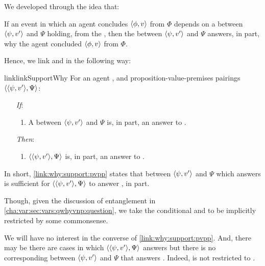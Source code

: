 \begin{note}
  We developed \qWhyVnP{} through the idea that:

  If an event in which an agent concludes \(\langle \phi, v \rangle\) from \(\Phi\) depends on a  between \(\langle \psi, v' \rangle\) and \(\Psi\) holding, from the \agpe{}, then the  between \(\langle \psi, v' \rangle\) and \(\Psi\) answers, in part, why the agent concluded \(\langle \phi, v \rangle\) from \(\Phi\).

  Hence, we link \qWhyVnP{} and \qWhy{} in the following way:

  \begin{restatable}{link}{linkSupportWhy}
    \label{link:why:support:pvpp}
    For an agent \vAgent{}, and proposition-value-premises pairings \(\langle \langle \psi, v' \rangle, \Psi \rangle\):

    \begin{itemize}
    \item[\emph{If}:]
      \begin{enumerate}[label=\alph*., ref=(\alph*)]
      \item
        A  between \(\langle \psi, v' \rangle\) and \(\Psi\) is, in part, an answer to \qWhyVnP{}.
      \end{enumerate}
    \item[\emph{Then}:]
      \begin{enumerate}[label=\alph*., ref=(\alph*), resume]
      \item
        \(\langle \langle \psi, v' \rangle, \Psi \rangle\) is, in part, an answer to \qWhy{}.
      \end{enumerate}
    \end{itemize}
    \vspace{-\baselineskip}
  \end{restatable}

  In short, \autoref{link:why:support:pvpp} states that \support{} between \(\langle \psi, v' \rangle\) and \(\Psi\) which answers \qWhyVnP{} is sufficient for \(\langle \langle \psi, v' \rangle, \Psi \rangle\) to answer \qWhy{}, in part.

  Though, given the discussion of entanglement in \autoref{cha:var:sec:vars:qwhyvnp:question}, we take the conditional and to be implicitly restricted by some commonsense.

  We will have no interest in the converse of \autoref{link:why:support:pvpp}.
  And, there may be there are cases in which \(\langle \langle \psi, v' \rangle, \Psi \rangle\) answers \qWhy{} but there is no corresponding \ros{} between \(\langle \psi, v' \rangle\) and \(\Psi\) that answers \qWhyVnP{}.
  Indeed, \qWhy{} is not restricted to .
\end{note}

